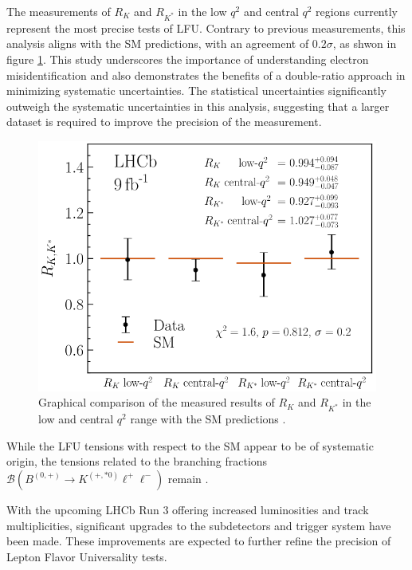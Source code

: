 The measurements of $R_K$ and $R_{K^*}$ in the low $q^2$ 
and central $q^2$ regions currently represent the most 
precise tests of LFU. 
Contrary to previous measurements, this analysis aligns 
with the SM predictions, with an agreement of 
$\num{0.2}\sigma$, as shwon in figure \ref{fig:results}. 
This study underscores the importance of understanding 
electron misidentification and also demonstrates the 
benefits of a double-ratio approach in minimizing 
systematic uncertainties. The statistical uncertainties 
significantly outweigh the systematic uncertainties in this 
analysis, suggesting that a larger dataset is required 
to improve the precision of the measurement.

\begin{figure}
    \centering
    \includegraphics[width=\linewidth]{figures/results.png}
    \caption{Graphical comparison of the measured results of $R_K$ and $R_{K^*}$ in the low and central $q^2$ range with the SM predictions \cite{lhcbcollaboration2022measurement}.}
    \label{fig:results}
\end{figure}

While the LFU tensions with respect to the SM 
appear to be of systematic origin, the tensions related to 
the branching fractions $\mathcal{B}(B^{(0,+)}\to K^{(+,*0)}\ell^+\ell^-)$ 
remain \cite{Branchingfraction}.

With the upcoming LHCb Run 3 offering increased luminosities 
and track multiplicities, significant upgrades to the subdetectors 
and trigger system have been made. These improvements are expected 
to further refine the precision of Lepton Flavor Universality tests.